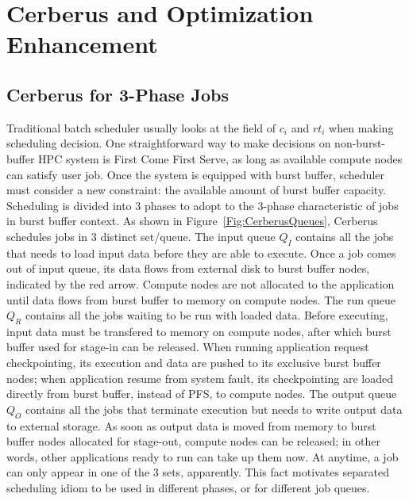 \section{Cerberus and Optimization Enhancement}
\label{Sec:Scheduler}

\subsection{Cerberus for 3-Phase Jobs}
Traditional batch scheduler usually looks at the field of $c_i$ and $rt_i$
when making scheduling decision.
One straightforward way to make decisions on non-burst-buffer HPC system is
First Come First Serve, as long as available compute nodes can satisfy user job.
Once the system is equipped with burst buffer, scheduler must consider a new constraint:
the available amount of burst buffer capacity.
Scheduling is divided into 3 phases to
adopt to the 3-phase characteristic of jobs in burst buffer context.
As shown in Figure~\ref{Fig:CerberusQueues},
Cerberus schedules jobs in 3 distinct set/queue.
The input queue $Q_I$ contains all the jobs that
needs to load input data before they are able to execute.
Once a job comes out of input queue, its data flows from external disk
to burst buffer nodes, indicated by the red arrow.
Compute nodes are not allocated to the application until
data flows from burst buffer to memory on compute nodes.
The run queue $Q_R$ contains all the jobs waiting to be run with loaded data.
Before executing, input data must be transfered to memory on compute nodes,
after which burst buffer used for stage-in can be released.
When running application request checkpointing, its execution and data are
pushed to its exclusive burst buffer nodes;
when application resume from system fault, its checkpointing are
loaded directly from burst buffer, instead of PFS, to compute nodes.
The output queue $Q_O$ contains all the jobs that
terminate execution but needs to write output data to external storage.
As soon as output data is moved from memory to burst buffer nodes allocated for stage-out,
compute nodes can be released;
in other words, other applications ready to run can take up them now.
At anytime, a job can only appear in one of the 3 sets, apparently.
This fact motivates separated scheduling idiom to be used in different phases,
or for different job queues.


